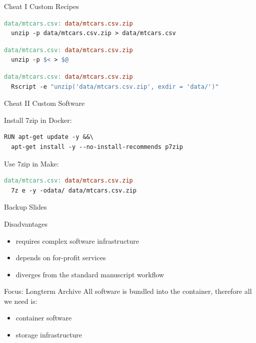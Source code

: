\documentclass[12pt,t]{beamer}
\begin{document}
{\begin{frame}[fragile, c]{Cheat I \textemdash{} Custom Recipes}
\begin{lstlisting}[language=make,basicstyle=\ttfamily\scriptsize]
data/mtcars.csv: data/mtcars.csv.zip
  unzip -p data/mtcars.csv.zip > data/mtcars.csv
\end{lstlisting}

\begin{lstlisting}[language=make,basicstyle=\ttfamily\scriptsize]
data/mtcars.csv: data/mtcars.csv.zip
  unzip -p $< > $@
\end{lstlisting}

\begin{lstlisting}[language=make,basicstyle=\ttfamily\scriptsize]
data/mtcars.csv: data/mtcars.csv.zip
  Rscript -e "unzip('data/mtcars.csv.zip', exdir = 'data/')"
\end{lstlisting}

\end{frame}

\begin{frame}[fragile, c]{Cheat II \textemdash{} Custom Software}

Install 7zip in Docker:

\begin{lstlisting}[basicstyle=\ttfamily\scriptsize]
RUN apt-get update -y &&\
  apt-get install -y --no-install-recommends p7zip
\end{lstlisting}

Use 7zip in Make:

\begin{lstlisting}[language=make,basicstyle=\ttfamily\scriptsize]
data/mtcars.csv: data/mtcars.csv.zip
  7z e -y -odata/ data/mtcars.csv.zip
\end{lstlisting}

\end{frame}

\begin{frame}[c]{}
\centering \Huge Backup Slides
\end{frame}

\begin{frame}[c]{Disadvantages}
\begin{itemize}
	\item requires complex software infrastructure
	\item depends on for-profit services
	\item diverges from the standard manuscript workflow
\end{itemize}
\end{frame}

\begin{frame}[c]{Focus: Longterm Archive}
	\textcolor<2>{lolit}{All software is bundled into the container, therefore all we need is:}
	\begin{itemize}
		\item \textcolor<2>{lolit}{container software}
		\item \textcolor<2>{lolit}{storage infrastructure}
	\end{itemize}


\end{frame}}
\end{document}
